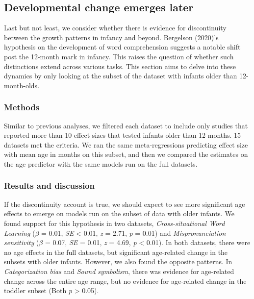 \documentclass[
  man]{apa6}
\begin{document}
\hypertarget{developmental-change-emerges-later}{%
\subsection{Developmental change emerges later}\label{developmental-change-emerges-later}}

Last but not least, we consider whether there is evidence for discontinuity between the growth patterns in infancy and beyond. Bergelson (2020)'s hypothesis on the development of word comprehension suggests a notable shift post the 12-month mark in infancy. This raises the question of whether such distinctions extend across various tasks. This section aims to delve into these dynamics by only looking at the subset of the dataset with infants older than 12-month-olds.

\hypertarget{methods-4}{%
\subsubsection{Methods}\label{methods-4}}

Similar to previous analyses, we filtered each dataset to include only studies that reported more than 10 effect sizes that tested infants older than 12 months. 15 datasets met the criteria. We ran the same meta-regressions predicting effect size with mean age in months on this subset, and then we compared the estimates on the age predictor with the same models run on the full datasets.

\hypertarget{results-and-discussion-3}{%
\subsubsection{Results and discussion}\label{results-and-discussion-3}}

If the discontinuity account is true, we should expect to see more significant age effects to emerge on models run on the subset of data with older infants. We found support for this hypothesis in two datasets, \emph{Cross-situational Word Learning} (\(\beta\) = 0.01, \emph{SE} \textless{} 0.01, \emph{z} = 2.71, \emph{p} = 0.01) and \emph{Mispronunciation sensitivity} (\(\beta\) = 0.07, \emph{SE} = 0.01, \emph{z} = 4.69, \emph{p} \textless{} 0.01). In both datasets, there were no age effects in the full datasets, but significant age-related change in the subsets with older infants. However, we also found the opposite patterns. In \emph{Categorization bias} and \emph{Sound symbolism}, there was evidence for age-related change across the entire age range, but no evidence for age-related change in the toddler subset (Both \emph{p} \textgreater{} 0.05).
\end{document}
